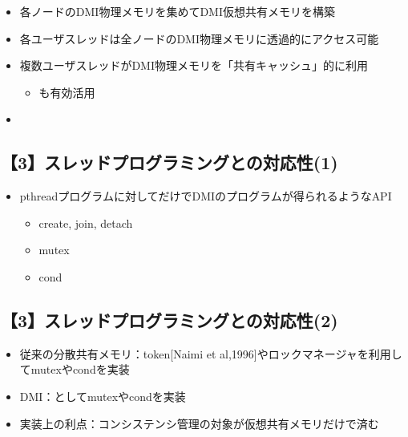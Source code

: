 \documentclass[25pt,landscape,papersize]{jsarticle}
\begin{document}

\begin{itemize}
\item 各ノードのDMI物理メモリを集めてDMI仮想共有メモリを構築
\item 各ユーザスレッドは全ノードのDMI物理メモリに透過的にアクセス可能
\item 複数ユーザスレッドがDMI物理メモリを「共有キャッシュ」的に利用
  \begin{itemize}
  \item {}も有効活用
  \end{itemize}
\item {}
\end{itemize}

\subsection{【3】スレッドプログラミングとの対応性(1)}

\begin{itemize}
\item pthreadプログラムに対してだけでDMIのプログラムが得られるようなAPI
  \begin{itemize}
  \item create, join, detach
  \item mutex
  \item cond
  \end{itemize}
\end{itemize}


\subsection{【3】スレッドプログラミングとの対応性(2)}

\begin{itemize}
\item 従来の分散共有メモリ：token[Naimi et al,1996]やロックマネージャを利用してmutexやcondを実装
\item DMI：としてmutexやcondを実装
\end{itemize}
\begin{itemize}
\item 実装上の利点：コンシステンシ管理の対象が仮想共有メモリだけで済む
\end{itemize}
\end{document}
